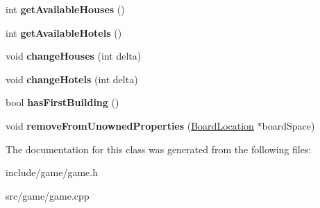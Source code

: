 \begin{DoxyCompactItemize}
\item 
\hypertarget{classGame_aec586cc1b24d298c4bb26bf5312dfb55}{int {\bfseries get\-Available\-Houses} ()}\label{classGame_aec586cc1b24d298c4bb26bf5312dfb55}

\item 
\hypertarget{classGame_a586fa1aadf0bf945f5d444fba55c749a}{int {\bfseries get\-Available\-Hotels} ()}\label{classGame_a586fa1aadf0bf945f5d444fba55c749a}

\item 
\hypertarget{classGame_ae0ccbff5d061e68217508f2f808b3584}{void {\bfseries change\-Houses} (int delta)}\label{classGame_ae0ccbff5d061e68217508f2f808b3584}

\item 
\hypertarget{classGame_ac572663f62b02076f229687b73c4ad58}{void {\bfseries change\-Hotels} (int delta)}\label{classGame_ac572663f62b02076f229687b73c4ad58}

\item 
\hypertarget{classGame_a21f97078e5a9aacb55ec2cad16a6675b}{bool {\bfseries has\-First\-Building} ()}\label{classGame_a21f97078e5a9aacb55ec2cad16a6675b}

\item 
\hypertarget{classGame_ad55d078f8d91f51950b5d4bed408d8f3}{void {\bfseries remove\-From\-Unowned\-Properties} (\hyperlink{classBoardLocation}{Board\-Location} $\ast$board\-Space)}\label{classGame_ad55d078f8d91f51950b5d4bed408d8f3}

\end{DoxyCompactItemize}


The documentation for this class was generated from the following files\-:\begin{DoxyCompactItemize}
\item 
include/game/game.\-h\item 
src/game/game.\-cpp\end{DoxyCompactItemize}
